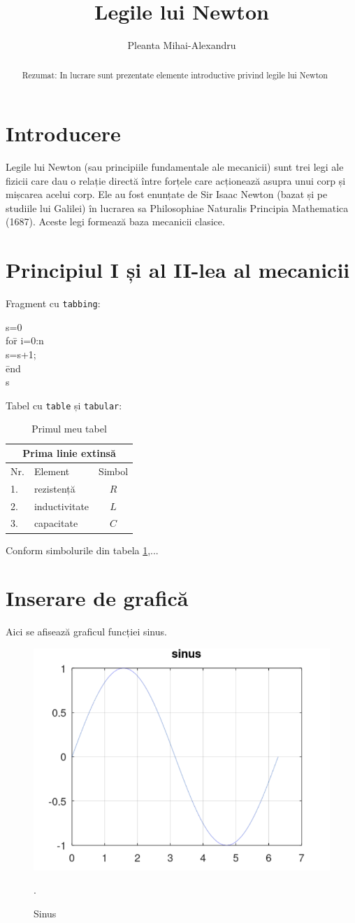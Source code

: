 \documentclass{article}
\title{Legile lui Newton}
\author{Pleanta Mihai-Alexandru}
\begin{document}
\maketitle	
\begin{abstract}
Rezumat: In lucrare sunt prezentate elemente introductive privind legile lui Newton
\end{abstract}
\section{Introducere}
Legile lui Newton (sau principiile fundamentale ale mecanicii) sunt trei legi ale fizicii care dau o relație directă între forțele care acționează asupra unui corp și mișcarea acelui corp. Ele au fost enunțate de Sir Isaac Newton (bazat și pe studiile lui Galilei) în lucrarea sa Philosophiae Naturalis Principia Mathematica (1687). Aceste legi formează baza mecanicii clasice.
\section{Principiul I și al II-lea al mecanicii}
Fragment cu \verb+tabbing+:
\begin{tabbing}
s=0\\
fo\= r i=0:n\\
\> s=s+1;\\\=
end\\
s
\end{tabbing}
Tabel cu \verb+table+ și \verb+tabular+:
\begin{table}[htpb]
\centering
\begin{tabular}{llc}
\multicolumn{3}{c}{Prima linie extinsă}\\\hline
Nr.&Element&Simbol\\\hline
1.&rezistență&$R$\\
2.&inductivitate&$L$\\
3.&capacitate&$C$

\end{tabular}
\caption{Primul meu tabel}\label{tab:RLC}
\end{table}
Conform simbolurile din tabela \ref{tab:RLC},...
\section{Inserare de grafică}
Aici se afisează graficul funcției sinus.
\begin{figure}[ht]
\centering
\includegraphics[scale=0.9]{SINUS.pdf}
\caption{Sinus}. \label{fig:sin}
\end{figure}
\end{document}
